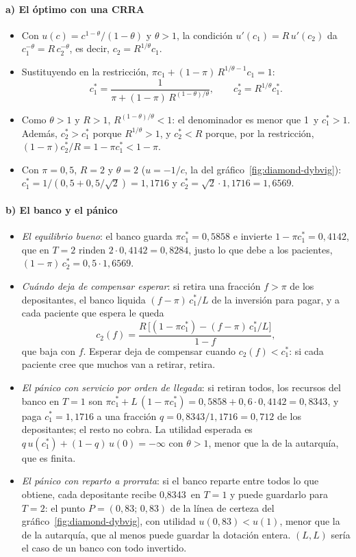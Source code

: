 \documentclass[11pt]{article}
\begin{document}
\paragraph{a) El óptimo con una CRRA}

\begin{itemize}
\item Con $u(c)=c^{1-\theta}/(1-\theta)$ y $\theta>1$, la condición $u'(c_1)=R\,u'(c_2)$ da $c_1^{-\theta}=R\,c_2^{-\theta}$, es decir, $c_2=R^{1/\theta}c_1$.
\item Sustituyendo en la restricción, $\pi c_1+(1-\pi)\,R^{1/\theta-1}c_1=1$:
  \[
  c_1^*=\frac{1}{\pi+(1-\pi)\,R^{(1-\theta)/\theta}},\qquad c_2^*=R^{1/\theta}c_1^* .
  \]
\item Como $\theta>1$ y $R>1$, $R^{(1-\theta)/\theta}<1$: el denominador es menor que 1~y $c_1^*>1$. Además, $c_2^*>c_1^*$ porque $R^{1/\theta}>1$, y $c_2^*<R$ porque, por la restricción, $(1-\pi)c_2^*/R=1-\pi c_1^*<1-\pi$.
\item Con $\pi=0{,}5$, $R=2$ y $\theta=2$ ($u=-1/c$, la del gráfico~\ref{fig:diamond-dybvig}): $c_1^*=1/(0{,}5+0{,}5/\sqrt2)=1{,}1716$ y $c_2^*=\sqrt2\cdot1{,}1716=1{,}6569$. \findemo
\end{itemize}

\paragraph{b) El banco y el pánico}

\begin{itemize}
\item \emph{El equilibrio bueno}: el banco guarda $\pi c_1^*=0{,}5858$ e invierte $1-\pi c_1^*=0{,}4142$, que en $T=2$ rinden $2\cdot0{,}4142=0{,}8284$, justo lo que debe a los pacientes, $(1-\pi)\,c_2^*=0{,}5\cdot1{,}6569$.
\item \emph{Cuándo deja de compensar esperar}: si retira una fracción $f>\pi$ de los depositantes, el banco liquida $(f-\pi)\,c_1^*/L$ de la inversión para pagar, y a cada paciente que espera le queda
  \[
  c_2(f)=\frac{R\,\big[(1-\pi c_1^*)-(f-\pi)\,c_1^*/L\big]}{1-f},
  \]
  que baja con $f$. Esperar deja de compensar cuando $c_2(f)<c_1^*$: si cada paciente cree que muchos van a retirar, retira.
\item \emph{El pánico con servicio por orden de llegada}: si retiran todos, los recursos del banco en $T=1$ son $\pi c_1^*+L\,(1-\pi c_1^*)=0{,}5858+0{,}6\cdot0{,}4142=0{,}8343$, y paga $c_1^*=1{,}1716$ a una fracción $q=0{,}8343/1{,}1716=0{,}712$ de los depositantes; el resto no cobra. La utilidad esperada es $q\,u(c_1^*)+(1-q)\,u(0)=-\infty$ con $\theta>1$, menor que la de la autarquía, que es finita.
\item \emph{El pánico con reparto a prorrata}: si el banco reparte entre todos lo que obtiene, cada depositante recibe 0,8343~en $T=1$ y puede guardarlo para $T=2$: el punto $P=(0{,}83;\,0{,}83)$ de la línea de certeza del gráfico~\ref{fig:diamond-dybvig}, con utilidad $u(0{,}83)<u(1)$, menor que la de la autarquía, que al menos puede guardar la dotación entera. $(L,L)$ sería el caso de un banco con todo invertido. \findemo
\end{itemize}
\end{document}
